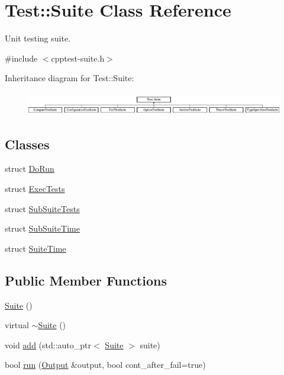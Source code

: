 \hypertarget{class_test_1_1_suite}{}\section{Test\+:\+:Suite Class Reference}
\label{class_test_1_1_suite}


Unit testing suite.  




{\ttfamily \#include $<$cpptest-\/suite.\+h$>$}

Inheritance diagram for Test\+:\+:Suite\+:\begin{figure}[H]
\begin{center}
\leavevmode
\includegraphics[height=1.025641cm]{class_test_1_1_suite}
\end{center}
\end{figure}
\subsection*{Classes}
\begin{DoxyCompactItemize}
\item 
struct \hyperlink{struct_test_1_1_suite_1_1_do_run}{Do\+Run}
\item 
struct \hyperlink{struct_test_1_1_suite_1_1_exec_tests}{Exec\+Tests}
\item 
struct \hyperlink{struct_test_1_1_suite_1_1_sub_suite_tests}{Sub\+Suite\+Tests}
\item 
struct \hyperlink{struct_test_1_1_suite_1_1_sub_suite_time}{Sub\+Suite\+Time}
\item 
struct \hyperlink{struct_test_1_1_suite_1_1_suite_time}{Suite\+Time}
\end{DoxyCompactItemize}
\subsection*{Public Member Functions}
\begin{DoxyCompactItemize}
\item 
\hyperlink{class_test_1_1_suite_a8cb51a002cf4e675820f91fe03ec9117}{Suite} ()
\item 
virtual \hyperlink{class_test_1_1_suite_a7a62f450d1e6c86cd6058e1c457aa4b7}{$\sim$\+Suite} ()
\item 
void \hyperlink{class_test_1_1_suite_a0237b63fc694ecb133d023cf2d6ab271}{add} (std\+::auto\+\_\+ptr$<$ \hyperlink{class_test_1_1_suite}{Suite} $>$ suite)
\item 
bool \hyperlink{class_test_1_1_suite_ad17746e218da79c537bc9d21e389f570}{run} (\hyperlink{class_test_1_1_output}{Output} \&output, bool cont\+\_\+after\+\_\+fail=true)
\end{DoxyCompactItemize}
